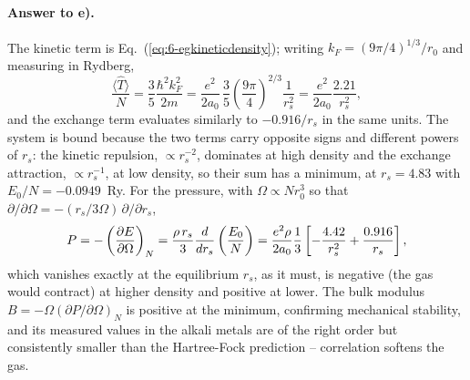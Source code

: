 \paragraph{Answer to e).}
The kinetic term is Eq.~(\ref{eq:6-egkineticdensity}); writing
$k_F=(9\pi/4)^{1/3}/r_0$ and measuring in Rydberg,
\begin{equation}
  \frac{\langle\hat{T}\rangle}{N}
  = \frac{3}{5}\frac{\hbar^2k_F^2}{2m}
  = \frac{e^2}{2a_0}\,\frac{3}{5}
    \left(\frac{9\pi}{4}\right)^{2/3}\frac{1}{r_s^2}
  = \frac{e^2}{2a_0}\frac{2.21}{r_s^2},
  \label{eq:6-exe6}
\end{equation}
and the exchange term evaluates similarly to $-0.916/r_s$ in the same units.
The system is bound because the two terms carry opposite signs and different
powers of $r_s$: the kinetic repulsion, $\propto r_s^{-2}$, dominates at high
density and the exchange attraction, $\propto r_s^{-1}$, at low density, so
their sum has a minimum, at $r_s=4.83$ with $E_0/N=-0.0949$~Ry.  For the
pressure, with $\Omega\propto Nr_0^3$ so that
$\partial/\partial\Omega=-(r_s/3\Omega)\,\partial/\partial r_s$,
\begin{equation}
  P = -\left(\frac{\partial E}{\partial\Omega}\right)_N
    = \frac{\rho\,r_s}{3}\frac{d}{dr_s}
      \left(\frac{E_0}{N}\right)
    = \frac{e^2\rho}{2a_0}\frac{1}{3}
      \left[-\frac{4.42}{r_s^2}+\frac{0.916}{r_s}\right],
  \label{eq:6-exe7}
\end{equation}
which vanishes exactly at the equilibrium $r_s$, as it must, is negative
(the gas would contract) at higher density and positive at lower.  The bulk
modulus $B=-\Omega(\partial P/\partial\Omega)_N$ is positive at the minimum,
confirming mechanical stability, and its measured values in the alkali metals
are of the right order but consistently smaller than the Hartree-Fock
prediction -- correlation softens the gas.
